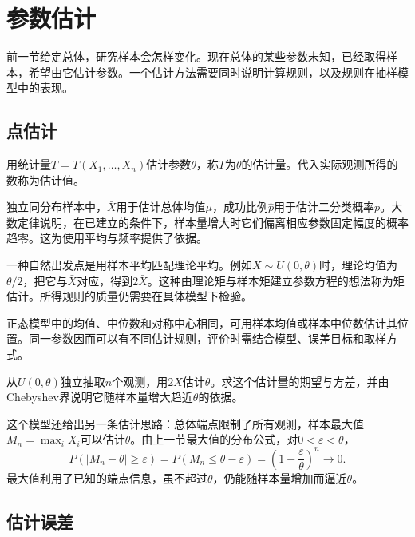 \FloatBarrier
\newpage
\section{参数估计}
\label{sec:prob-estimation}

前一节给定总体，研究样本会怎样变化。现在总体的某些参数未知，已经取得样本，希望由它估计参数。一个估计方法需要同时说明计算规则，以及规则在抽样模型中的表现。

\subsection{点估计}

\begin{definition}
用统计量\(T=T(X_1,\ldots,X_n)\)估计参数\(\theta\)，称\(T\)为\(\theta\)的{\heiti 估计量}。代入实际观测所得的数称为{\heiti 估计值}。
\end{definition}

独立同分布样本中，\(\bar X\)用于估计总体均值\(\mu\)，成功比例\(\widehat p\)用于估计二分类概率\(p\)。大数定律说明，在已建立的条件下，样本量增大时它们偏离相应参数固定幅度的概率趋零。这为使用平均与频率提供了依据。

一种自然出发点是用样本平均匹配理论平均。例如\(X\sim U(0,\theta)\)时，理论均值为\(\theta/2\)，把它与\(\bar X\)对应，得到\(2\bar X\)。这种由理论矩与样本矩建立参数方程的想法称为{\heiti 矩估计}。所得规则的质量仍需要在具体模型下检验。

正态模型中的均值、中位数和对称中心相同，可用样本均值或样本中位数估计其位置。同一参数因而可以有不同估计规则，评价时需结合模型、误差目标和取样方式。

\begin{example}
从\(U(0,\theta)\)独立抽取\(n\)个观测，用\(2\bar X\)估计\(\theta\)。求这个估计量的期望与方差，并由Chebyshev界说明它随样本量增大趋近\(\theta\)的依据。
\end{example}

这个模型还给出另一条估计思路：总体端点限制了所有观测，样本最大值\(M_n=\max_iX_i\)可以估计\(\theta\)。由上一节最大值的分布公式，对\(0<\varepsilon<\theta\)，
\[
 P(|M_n-\theta|\ge\varepsilon)
 =P(M_n\le\theta-\varepsilon)
 =\left(1-\frac\varepsilon\theta\right)^n\longrightarrow0.
\]
最大值利用了已知的端点信息，虽不超过\(\theta\)，仍能随样本量增加而逼近\(\theta\)。

\subsection{估计误差}

